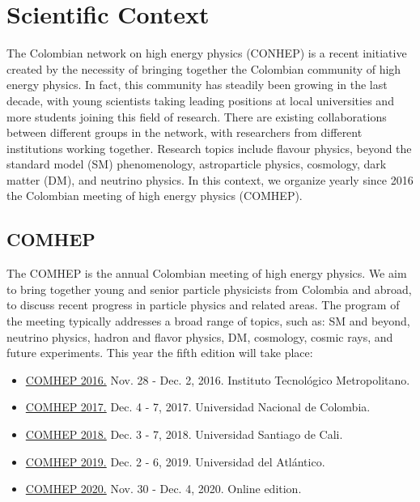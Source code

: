 \documentclass[a4paper,11pt]{article}
\begin{document}
\notoc
\maketitle

\section{Scientific Context}
The Colombian network on high energy physics (CONHEP) is a recent initiative created by the necessity of bringing together the Colombian community of high energy physics.
In fact, this community has steadily been growing in the last decade, with young scientists taking leading positions at local universities and more students joining this field of research. There are existing collaborations between different groups in the network, with researchers from different institutions working together. Research topics include flavour physics, beyond the standard model (SM) phenomenology, astroparticle physics, cosmology, dark matter (DM), and neutrino physics. In this context, we organize yearly since 2016 the Colombian meeting of high energy physics (COMHEP).

\subsection*{COMHEP}
The COMHEP is the annual Colombian meeting of high energy physics. We aim to bring together young and senior particle physicists from Colombia and abroad, to discuss recent progress in particle physics and related areas. The program of the meeting typically addresses a broad range of topics, such as: SM and beyond, neutrino physics, hadron and flavor physics, DM, cosmology, cosmic rays, and future experiments.
This year the fifth edition will take place:
\begin{itemize}
    \item \href{https://indico.cern.ch/e/comhep}{COMHEP 2016.} Nov. 28 - Dec. 2, 2016. Instituto Tecnológico Metropolitano.
    \item \href{https://indico.cern.ch/e/comhep2}{COMHEP 2017.} Dec. 4 - 7, 2017. Universidad Nacional de Colombia.
    \item \href{https://indico.cern.ch/e/comhep3}{COMHEP 2018.} Dec. 3 - 7, 2018. Universidad Santiago de Cali.
    \item \href{https://indico.cern.ch/e/comhep4}{COMHEP 2019.} Dec. 2 - 6, 2019. Universidad del Atlántico.
    \item \href{https://indico.cern.ch/e/comhep5}{COMHEP 2020.} Nov. 30 - Dec. 4, 2020. Online edition.
\end{itemize}
\end{document}
